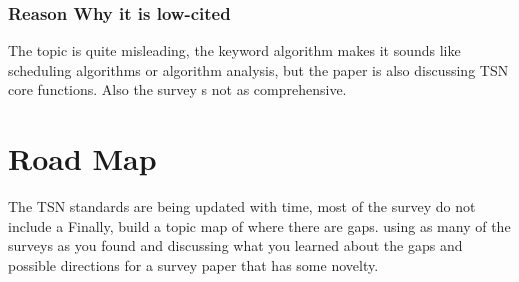 \documentclass{article}
\begin{document}
\subsubsection{Reason Why it is low-cited}
The topic is quite misleading, the keyword algorithm makes it sounds like scheduling algorithms or algorithm analysis, but the paper is also discussing TSN core functions. Also the survey s not as comprehensive.
\section{Road Map}
The TSN standards are being updated with time, most of the survey do not include a 
Finally,  build a topic map of where there are gaps. using as many of the surveys as you found and discussing what you learned about the gaps and possible directions for a survey paper that has some novelty. 


\end{document}
